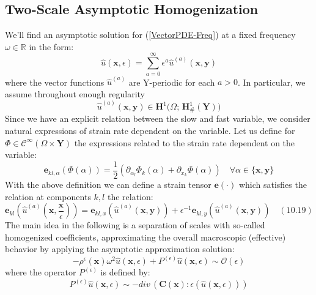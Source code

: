 \subsection{Two-Scale Asymptotic Homogenization}
We'll find an asymptotic solution for (\ref{VectorPDE-Freq}) at a fixed frequency $\omega \in \mathbb{R}$ in the form:
\begin{equation*}
    \label{AsymptoticExpansion}
    \hat{u}(\mathbf{x},\epsilon) = \sum_{a=0}^{\infty} \epsilon^a \hat{u}^{(a)}(\mathbf{x},\mathbf{y}) 
\end{equation*}
where the vector functions $\hat{u}^{(a)}$ are Y-periodic for each $a >0$. 
In particular, we assume throughout enough regularity
\begin{equation*}
    \hat{u}^{(a)}(\mathbf{x},\mathbf{y}) \in \mathbf{H}^1\big(\Omega; \, \mathbf{H}^1_{\#}(\mathbf{Y})\big)
\end{equation*}
Since we have an explicit relation between the slow and fast variable, we consider natural expressions of strain rate dependent on the variable. Let us define for $\Phi \in \mathcal{C}^{\infty}(\Omega \times \mathbf{Y})$ the expressions related to the strain rate dependent on the variable:
\begin{equation*}
    \mathbf{e}_{kl,\alpha} (\Phi(\alpha)) = \frac{1}{2}(\partial_{\alpha_l} \Phi_k (\alpha) + \partial_{x_k} \Phi (\alpha)) \quad \forall \alpha \in \{\mathbf{x}, \mathbf{y}\}
\end{equation*}
With the above definition we can define a strain tensor $\mathbf{e}(\cdot)$ which satisfies the relation at components $k,l$ the relation:
\begin{equation}
    \label{Multiscale-Strain}
    \mathbf{e}_{kl} ( \hat{u}^{(a)}(\mathbf{x}, \frac{\mathbf{x}}{\epsilon})) = \mathbf{e}_{kl,x}( \hat{u}^{(a)} (\mathbf{x},\mathbf{y})) + \epsilon^{-1} \mathbf{e}_{kl,y} (\hat{u}^{(a)}(\mathbf{x},\mathbf{y})) \quad (10.19)
\end{equation}
The main idea in the following is a separation of scales with so-called homogenized coefficients, approximating the overall macroscopic (effective) behavior by applying the asymptotic approximation solution:
\begin{equation*}
    -\rho^{\epsilon}(\mathbf{x}) \omega^2 \hat{u}(\mathbf{x}, \epsilon) + P^{(\epsilon)}\hat{u}(\mathbf{x},\epsilon) \sim \mathcal{O}(\epsilon) 
\end{equation*}
where the operator $P^{(\epsilon)}$ is defined by:
\begin{equation}
    \label{P-Operator}
    P^{(\epsilon)}\hat{u}(\mathbf{x},\epsilon) \sim - div \, (\mathbf{C}(\mathbf{x}): \epsilon(\hat{u}(\mathbf{x},\epsilon)))
\end{equation}

